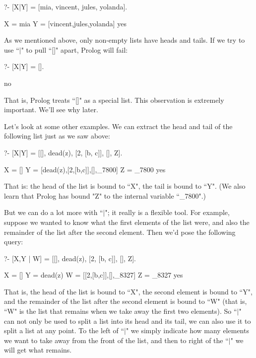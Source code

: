 \begin{LPNcodedisplay}
?- [X|Y] = [mia, vincent, jules, yolanda].

X = mia
Y = [vincent,jules,yolanda]
yes
\end{LPNcodedisplay}



As we mentioned above, only non-empty lists have heads and tails.  If
we try to use ``$|$" to pull ``[]" apart, Prolog will fail:

\begin{LPNcodedisplay}
?- [X|Y] = [].

no
\end{LPNcodedisplay}
That is, Prolog treats ``[]" as a special list.  This observation
is extremely  important.  We'll see why later.

Let's look at some other examples.  We can extract the head and tail
of the following list just as we saw above:

\begin{LPNcodedisplay}
?- [X|Y] = [[], dead(z), [2, [b, c]], [], Z].

X = []
Y = [dead(z),[2,[b,c]],[],_7800]
Z = _7800
yes
\end{LPNcodedisplay}
That is: the head of the list is bound to ``X", the tail is bound
to ``Y".  (We also learn that Prolog has bound
"Z" to the internal variable ``\_7800".)

But we can do a lot more with ``$|$"; it really is a
flexible tool.  For example, suppose we wanted to know what the first
 elements of the list were, and also the remainder of the
list after the second element.  Then we'd pose the following query:

\begin{LPNcodedisplay}
?- [X,Y | W] = [[], dead(z), [2, [b, c]], [], Z].

X = []
Y = dead(z)
W = [[2,[b,c]],[],_8327]
Z = _8327
yes
\end{LPNcodedisplay}

That is, the head of the list is bound to ``X", the second element is
bound to ``Y", and the remainder of the list after the second element
is bound to ``W" (that is, ``W" is the list that remains when we take
away the first two elements). So ``$|$" can not only be used to split a
list into its head and its tail, we can also use it to split a list at
any point. To the left of ``$|$" we simply indicate how many elements we
want to take away from the front of the list, and then to right of the
``$|$" we will get what remains.

